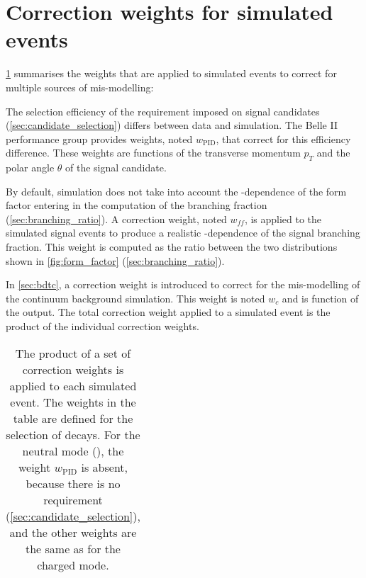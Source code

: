 \clearpage
\section{Correction weights for simulated events} \label{sec:weights}

\cref{tab:weights} summarises the weights that are applied to simulated events to correct for multiple sources of mis-modelling:
\bi
\item The selection efficiency of the \PID requirement imposed on signal \Kp candidates (\cref{sec:candidate_selection}) differs between data and simulation.
The Belle II performance group provides weights, noted $w_{\mathrm{PID}}$, that correct for this efficiency difference.
These weights are functions of the transverse momentum $p_T$ and the polar angle $\theta$ of the signal \Kp candidate.
\item By default, simulation does not take into account the \qq-dependence of the form factor entering in the computation of the \BKnn branching fraction (\cref{sec:branching_ratio}).
A correction weight, noted $w_{ff}$, is applied to the simulated signal events to produce a realistic \qq-dependence of the signal branching fraction.
This weight is computed as the ratio between the two distributions shown in \cref{fig:form_factor} (\cref{sec:branching_ratio}).
\item In \cref{sec:bdtc}, a correction weight is introduced to correct for the mis-modelling of the continuum background simulation.
This weight is noted $w_{c}$ and is function of the \bdtc output.
\ei
The total correction weight applied to a simulated event is the product of the individual correction weights.
\vspace{1cm}

\begin{table}[hb]
\caption{
The product of a set of correction weights is applied to each simulated event.
The weights in the table are defined for the selection of \BKpnn decays.
For the neutral mode (\BKznn), the \PID weight $w_{\mathrm{PID}}$ is absent, because there is no \PID requirement (\cref{sec:candidate_selection}), and the other weights are the same as for the charged mode.
}
\begin{center}
\begin{tabular}{ll}

\end{tabular}
\end{center}
\label{tab:weights}
\end{table}
